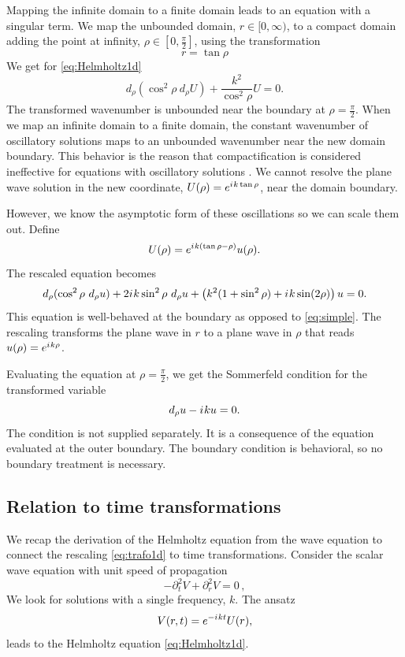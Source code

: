 \documentclass[final,onefignum,onetabnum]{siamart190516}
\newcommand{\be}{\begin{equation}}
\newcommand{\ee}{\end{equation}}
\newcommand{\iu}{{i\mkern1mu}}
\begin{document}
Mapping the infinite domain to a finite domain leads to an equation with a singular term. We map the unbounded domain, $r\in[0,\infty)$, to a compact domain adding the point at infinity, $\rho\in[0,\tfrac{\pi}{2}]$, using the transformation
\be\label{eq:space_compact1d} r = \tan \rho \ee
We get for \eqref{eq:Helmholtz1d}
\be\label{eq:simple} d_\rho(\cos^2 \rho \ d_\rho U )+ \frac{k^2}{\cos^2 \rho} U = 0. \ee
The transformed wavenumber is unbounded near the boundary at $\rho=\tfrac{\pi}{2}$. When we map an infinite domain to a finite domain, the constant wavenumber of oscillatory solutions maps to an unbounded wavenumber near the new domain boundary. This behavior is the reason that compactification is considered ineffective for equations with oscillatory solutions \cite{GroschOrszag77, shen2014approximations}. We cannot resolve the plane wave solution in the new coordinate, $U(\rho)=e^{\iu k \tan\rho}$, near the domain boundary.  

However, we know the asymptotic form of these oscillations so we can scale them out. Define
\be\label{eq:trafo1d} U(\rho) = e^{\iu k (\tan\rho - \rho)} u(\rho). \ee
The rescaled equation becomes
\be\label{eq:transformed} d_\rho(\cos^2 \rho \ d_\rho u ) + 2\iu k \sin^2\rho \ d_\rho u + \left(k^2 (1+\sin^2\rho)+\iu k \sin(2\rho) \right) u = 0. \ee
This equation is well-behaved at the boundary as opposed to \eqref{eq:simple}. The rescaling transforms the plane wave in $r$ to a plane wave in $\rho$ that reads $u(\rho)=e^{\iu k \rho}$.

Evaluating the equation at $\rho=\tfrac{\pi}{2}$, we get the Sommerfeld condition for the transformed variable
\[ d_\rho u - \iu k u = 0. \]
The condition is not supplied separately. It is a consequence of the equation evaluated at the outer boundary. The boundary condition is behavioral, so no boundary treatment is necessary. 

\subsection{Relation to time transformations}\label{sec:time}
We recap the derivation of the Helmholtz equation from the wave equation to connect the rescaling \eqref{eq:trafo1d} to time transformations. Consider the scalar wave equation with unit speed of propagation 
\[ -\partial_t^2 V + \partial_r^2 V = 0\,, \]
We look for solutions with a single frequency, $k$. The ansatz 
\be\label{eq:ansatz} 
V(r,t)= e^{-\iu k t} U(r),
\ee 
leads to the Helmholtz equation \eqref{eq:Helmholtz1d}.
\end{document}
